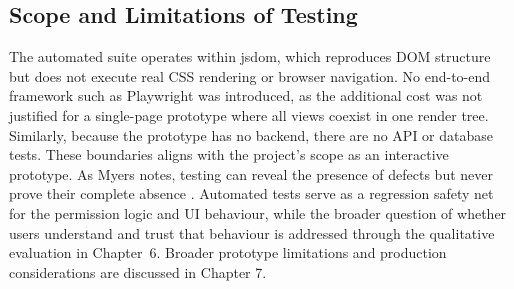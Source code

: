 \subsection*{Scope and Limitations of Testing}

The automated suite operates within jsdom, which reproduces DOM structure but does not execute real CSS rendering or browser navigation. No end-to-end framework such as Playwright was introduced, as the additional cost was not justified for a single-page prototype where all views coexist in one render tree. Similarly, because the prototype has no backend, there are no API or database tests. These boundaries aligns with the project's scope as an interactive prototype. As Myers notes, testing can reveal the presence of defects but never prove their complete absence \cite{myers_2011}. Automated tests serve as a regression safety net for the permission logic and UI behaviour, while the broader question of whether users understand and trust that behaviour is addressed through the qualitative evaluation in Chapter~6. Broader prototype limitations and production considerations are discussed in Chapter 7.


